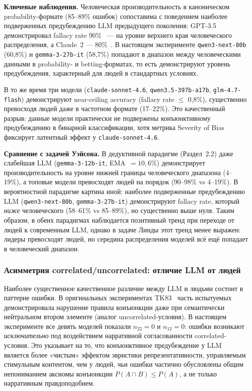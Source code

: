 \textbf{Ключевые наблюдения.} Человеческая производительность в каноническом probability-формате (85--89\% ошибок) сопоставима с поведением наиболее подверженных предубеждению LLM предыдущего поколения: GPT-3.5 демонстрировал fallacy rate 90\%~\cite{macmillan2024irrationality, suri2024large} --- на уровне верхнего края человеческого распределения, а Claude~2 --- 80\%~\cite{macmillan2024irrationality}. В настоящем эксперименте \texttt{qwen3-next-80b} (60{,}8\%) и \texttt{gemma-3-27b-it} (58{,}7\%) попадают в диапазон между человеческими данными в probability- и betting-форматах, то есть демонстрируют уровень предубеждения, характерный для людей в стандартных условиях.

В то же время три модели (\texttt{claude-sonnet-4.6}, \texttt{qwen3.5-397b-a17b}, \texttt{glm-4.7-flash}) демонстрируют near-ceiling accuracy (fallacy rate $\leq$ 0{,}8\%), существенно превосходя людей даже в частотном формате (17--22\%). Это качественный разрыв: данные модели практически не подвержены конъюнктивному предубеждению в бинарной классификации, хотя метрика Severity of Bias фиксирует латентный эффект у \texttt{claude-sonnet-4.6}.

\textbf{Сравнение с задачей Уэйсона.} В дедуктивной парадигме (Раздел~2.2) даже слабейшая LLM (\texttt{gemma-3-12b-it}, EMA~$= 10{,}6\%$) демонстрирует производительность на уровне нижней границы человеческого диапазона (4--19\%), а топовые модели превосходят людей на порядок (90--98\% vs 4--19\%). В вероятностной парадигме картина иной: наиболее подверженные предубеждению LLM (\texttt{qwen3-next-80b}, \texttt{gemma-3-27b-it}) демонстрируют fallacy rate, который \textit{ниже} человеческого (58--61\% vs 85--89\%), но существенно выше нуля. Таким образом, в обеих парадигмах наблюдается позитивный тренд при переходе от людей к современным LLM, однако в задаче Линды этот тренд менее выражен: лидеры превосходят людей, но середина распределения моделей всё ещё попадает в человеческий диапазон.

\subsubsection*{Асимметрия correlated/uncorrelated: отличие LLM от людей}

Наиболее существенное качественное различие между LLM и людьми состоит в паттерне ошибки. В оригинальных экспериментах TK83~\cite{tversky1983extensional} часть испытуемых демонстрировала нарушение правила конъюнкции даже при семантически нейтральном втором элементе (аналог uncorrelated-условия). В настоящем эксперименте все девять моделей показали $n_{22} = 0$ и $n_{12} = 0$: ошибки возникают \textit{исключительно} под воздействием нарративной согласованности correlated-условия. Это указывает на то, что конъюнктивное предубеждение у LLM является более «чистым» эффектом эвристики репрезентативности, управляемым стимульным контентом, чем у людей, чьи ошибки частично обусловлены общим непониманием аксиомы конъюнкции $P(A \cap B) \leq P(A)$, а не только нарративным правдоподобием.


